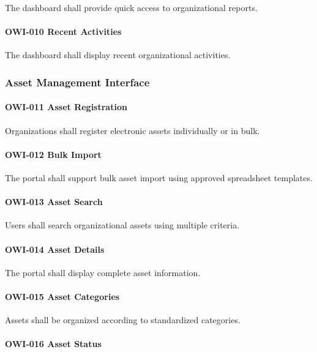 The dashboard shall provide quick access to organizational reports.

\paragraph{OWI-010 Recent Activities}

The dashboard shall display recent organizational activities.


\subsubsection*{Asset Management Interface}

\paragraph{OWI-011 Asset Registration}

Organizations shall register electronic assets individually or in bulk.

\paragraph{OWI-012 Bulk Import}

The portal shall support bulk asset import using approved spreadsheet
templates.

\paragraph{OWI-013 Asset Search}

Users shall search organizational assets using multiple criteria.

\paragraph{OWI-014 Asset Details}

The portal shall display complete asset information.

\paragraph{OWI-015 Asset Categories}

Assets shall be organized according to standardized categories.

\paragraph{OWI-016 Asset Status}

